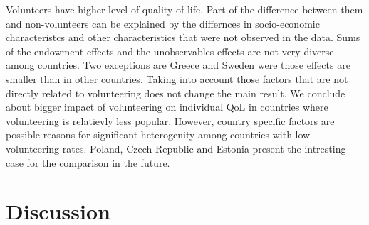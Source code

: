 \documentclass[10pt, letterpaper]{article}
\begin{document}
\begin{spacing}{1.4}
\begin{figure}[H]
\begin{minipage}{1\linewidth}
\end{minipage}
\end{figure}
 
Volunteers have higher level of quality of life. Part of the difference between them and non-volunteers can be explained by the differnces in socio-economic characteristcs and other characteristics that were not observed in the data. Sums of the endowment effects and the unobservables effects are not very diverse among countries. Two exceptions are Greece and Sweden were those effects are smaller than in other countries. Taking into account those factors that are not directly related to volunteering does not change the main result. We conclude about bigger impact of volunteering on individual QoL in countries where volunteering is relatievly less popular. However, country specific factors are possible reasons for significant heterogenity among countries with low volunteering rates. Poland, Czech Republic and Estonia present the intresting case for the comparison in the future.   
 
\section{Discussion}


\end{spacing}
\end{document}
